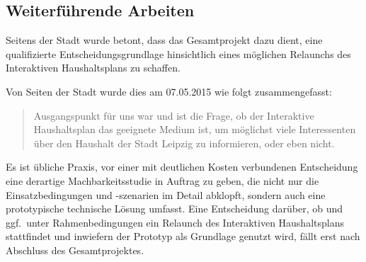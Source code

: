 \documentclass[11pt,a4paper,twoside]{article}
\begin{document}
\subsection{Weiterführende Arbeiten} 

Seitens der Stadt wurde betont, dass das Gesamtprojekt dazu dient, eine
qualifizierte Entscheidungsgrundlage hinsichtlich eines möglichen Relaunchs des
Interaktiven Haushaltsplans zu schaffen.

Von Seiten der Stadt wurde dies am 07.05.2015 wie folgt zusammengefasst:
\begin{quote}
  Ausgangspunkt für uns war und ist die Frage, ob der Interaktive
  Haushaltsplan das geeignete Medium ist, um möglichst viele Interessenten
  über den Haushalt der Stadt Leipzig zu informieren, oder eben nicht.
\end{quote}
Es ist übliche Praxis, vor einer mit deutlichen Kosten verbundenen
Entscheidung eine derartige Machbarkeitsstudie in Auftrag zu geben, die nicht
nur die Einsatzbedingungen und -szenarien im Detail abklopft, sondern auch
eine prototypische technische Lösung umfasst. Eine Entscheidung darüber, ob
und ggf.\ unter Rahmenbedingungen ein Relaunch des Interaktiven Haushaltsplans
stattfindet und inwiefern der Prototyp als Grundlage genutzt wird, fällt erst
nach Abschluss des Gesamtprojektes.
\end{document}
